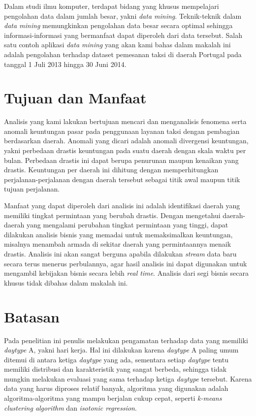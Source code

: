 \documentclass{article}
\begin{document}
Dalam studi ilmu komputer, terdapat bidang yang khusus mempelajari pengolahan data dalam jumlah besar, yakni \textit{data mining}. Teknik-teknik dalam \textit{data mining} memungkinkan pengolahan data besar secara optimal sehingga informasi-informasi yang bermanfaat dapat diperoleh dari data tersebut. Salah satu contoh aplikasi \textit{data mining} yang akan kami bahas dalam makalah ini adalah pengolahan terhadap dataset pemesanan taksi di daerah Portugal pada tanggal 1 Juli 2013 hingga 30 Juni 2014.


\section{Tujuan dan Manfaat}

Analisis yang kami lakukan bertujuan mencari dan menganalisis fenomena serta anomali keuntungan pasar pada penggunaan layanan taksi dengan pembagian berdasarkan daerah. Anomali yang dicari adalah anomali divergensi keuntungan, yakni perbedaan drastis keuntungan pada suatu daerah dengan skala waktu per bulan. Perbedaan drastis ini dapat berupa penurunan maupun kenaikan yang drastis. Keuntungan per daerah ini dihitung dengan memperhitungkan perjalanan-perjalanan dengan daerah tersebut sebagai titik awal maupun titik tujuan perjalanan.

Manfaat yang dapat diperoleh dari analisis ini adalah identifikasi daerah yang memiliki tingkat permintaan yang berubah drastis. Dengan mengetahui daerah-daerah yang mengalami perubahan tingkat permintaan yang tinggi, dapat dilakukan analisis bisnis yang memadai untuk memaksimalkan keuntungan, misalnya menambah armada di sekitar daerah yang permintaannya menaik drastis. Analisis ini akan sangat berguna apabila dilakukan \textit{stream} data baru secara terus menerus perbulannya, agar hasil analisis ini dapat digunakan untuk mengambil kebijakan bisnis secara lebih\textit{ real time}.  Analisis dari segi bisnis secara khusus tidak dibahas dalam makalah ini.

\section{Batasan}

Pada penelitian ini penulis melakukan pengamatan terhadap data yang memiliki \textit{daytype} A, yakni hari kerja. Hal ini dilakukan karena \textit{daytype} A paling umum ditemui di antara ketiga \textit{daytype} yang ada, sementara setiap \textit{daytype} tentu memiliki distribusi dan karakteristik yang sangat berbeda, sehingga tidak mungkin melakukan evaluasi yang sama terhadap ketiga \textit{daytype} tersebut. Karena data yang harus diproses relatif banyak, algoritma yang digunakan adalah algoritma-algoritma yang mampu berjalan cukup cepat, seperti \textit{k-means clustering algorithm} dan  \textit{isotonic regression}.
\end{document}
